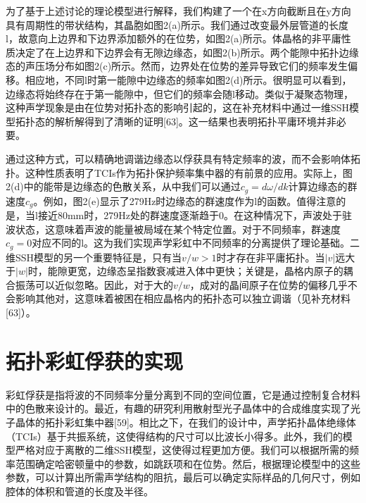 为了基于上述讨论的理论模型进行解释，我们构建了一个在x方向截断且在y方向具有周期性的带状结构，其晶胞如图2(a)所示。我们通过改变最外层管道的长度l，故意向上边界和下边界添加额外的在位势，如图2(a)所示。体晶格的非平庸性质决定了在上边界和下边界会有无隙边缘态，如图2(b)所示。两个能隙中拓扑边缘态的声压场分布如图2(c)所示。然而，边界处在位势的差异导致它们的频率发生偏移。相应地，不同l时第一能隙中边缘态的频率如图2(d)所示。很明显可以看到，边缘态将始终存在于第一能隙中，但它们的频率会随l移动。类似于凝聚态物理，这种声学现象是由在位势对拓扑态的影响引起的，这在补充材料中通过一维SSH模型拓扑态的解析解得到了清晰的证明[63]。这一结果也表明拓扑平庸环境并非必要。

通过这种方式，可以精确地调谐边缘态以俘获具有特定频率的波，而不会影响体拓扑。这种性质表明了TCIs作为拓扑保护频率集中器的有前景的应用。实际上，图2(d)中的能带是边缘态的色散关系，从中我们可以通过$c_g = d\omega/dk$计算边缘态的群速度$c_g$。例如，图2(e)显示了279Hz时边缘态的群速度作为l的函数。值得注意的是，当l接近80mm时，279Hz处的群速度逐渐趋于0。在这种情况下，声波处于驻波状态，这意味着声波的能量被局域在某个特定位置。对于不同频率，群速度$c_g = 0$对应不同的l。这为我们实现声学彩虹中不同频率的分离提供了理论基础。二维SSH模型的另一个重要特征是，只有当$v/w > 1$时才存在非平庸拓扑。当$|v|$远大于$|w|$时，能隙更宽，边缘态呈指数衰减进入体中更快；关键是，晶格内原子的耦合振荡可以近似忽略。因此，对于大的$v/w$，成对的晶间原子在位势的偏移几乎不会影响其他对，这意味着被困在相应晶格内的拓扑态可以独立调谐（见补充材料[63]）。

\section{拓扑彩虹俘获的实现}
彩虹俘获是指将波的不同频率分量分离到不同的空间位置，它是通过控制复合材料中的色散来设计的。最近，有趣的研究利用散射型光子晶体中的合成维度实现了光子晶体的拓扑彩虹集中器[59]。相比之下，在我们的设计中，声学拓扑晶体绝缘体（TCIs）基于共振系统，这使得结构的尺寸可以比波长小得多。此外，我们的模型严格对应于离散的二维SSH模型，这使得过程更加方便。我们可以根据所需的频率范围确定哈密顿量中的参数，如跳跃项和在位势。然后，根据理论模型中的这些参数，可以计算出所需声学结构的阻抗，最后可以确定实际样品的几何尺寸，例如腔体的体积和管道的长度及半径。


